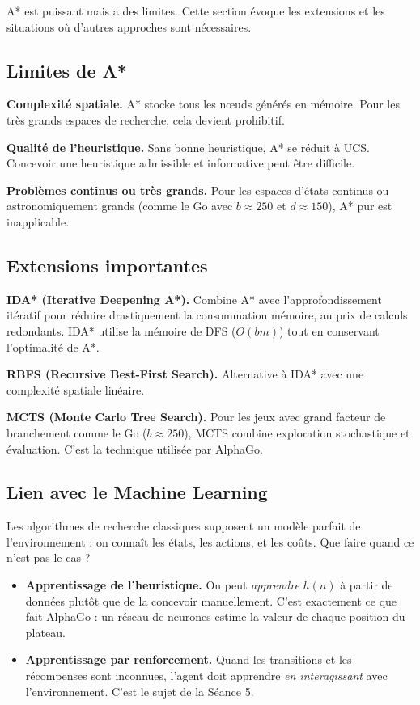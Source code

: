 \documentclass[11pt,a4paper]{article}
\begin{document}
A* est puissant mais a des limites. Cette section évoque les extensions et les situations où d'autres approches sont nécessaires.

\subsection{Limites de A*}

\textbf{Complexité spatiale.} A* stocke tous les nœuds générés en mémoire. Pour les très grands espaces de recherche, cela devient prohibitif.

\textbf{Qualité de l'heuristique.} Sans bonne heuristique, A* se réduit à UCS. Concevoir une heuristique admissible et informative peut être difficile.

\textbf{Problèmes continus ou très grands.} Pour les espaces d'états continus ou astronomiquement grands (comme le Go avec $b \approx 250$ et $d \approx 150$), A* pur est inapplicable.

\subsection{Extensions importantes}

\textbf{IDA* (Iterative Deepening A*).} Combine A* avec l'approfondissement itératif pour réduire drastiquement la consommation mémoire, au prix de calculs redondants. IDA* utilise la mémoire de DFS ($O(bm)$) tout en conservant l'optimalité de A*.

\textbf{RBFS (Recursive Best-First Search).} Alternative à IDA* avec une complexité spatiale linéaire.

\textbf{MCTS (Monte Carlo Tree Search).} Pour les jeux avec grand facteur de branchement comme le Go ($b \approx 250$), MCTS combine exploration stochastique et évaluation. C'est la technique utilisée par AlphaGo.

\subsection{Lien avec le Machine Learning}

Les algorithmes de recherche classiques supposent un modèle parfait de l'environnement : on connaît les états, les actions, et les coûts. Que faire quand ce n'est pas le cas ?

\begin{itemize}
    \item \textbf{Apprentissage de l'heuristique.} On peut \textit{apprendre} $h(n)$ à partir de données plutôt que de la concevoir manuellement. C'est exactement ce que fait AlphaGo : un réseau de neurones estime la valeur de chaque position du plateau.
    \item \textbf{Apprentissage par renforcement.} Quand les transitions et les récompenses sont inconnues, l'agent doit apprendre \textit{en interagissant} avec l'environnement. C'est le sujet de la Séance 5.
\end{itemize}
\end{document}
